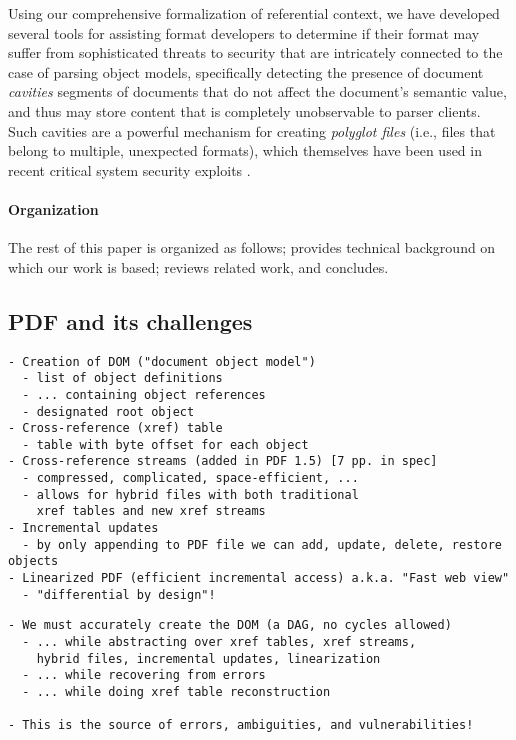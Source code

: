 Using our comprehensive formalization of referential context, we have
developed several tools for assisting format developers to determine
if their format may suffer from sophisticated threats to security that
are intricately connected to the case of parsing object models,
specifically detecting the presence of document \emph{cavities}
segments of documents that do not affect the document's semantic
value, and thus may store content that is completely unobservable to
parser clients.
%
Such cavities are a powerful mechanism for creating \emph{polyglot
  files} (i.e., files that belong to multiple, unexpected formats),
which themselves have been used in recent critical system security
exploits .

\paragraph*{Organization} The rest of this paper is organized as
follows;
%
 provides technical background on which our work
is based;
%
%
 reviews related work, and %
 concludes.

\subsection{PDF and its challenges}
\label{sec:pdf-challenges}

\begin{lstlisting}[style=meta]
- Creation of DOM ("document object model")
  - list of object definitions
  - ... containing object references
  - designated root object
- Cross-reference (xref) table
  - table with byte offset for each object
- Cross-reference streams (added in PDF 1.5) [7 pp. in spec]
  - compressed, complicated, space-efficient, ...
  - allows for hybrid files with both traditional
    xref tables and new xref streams
- Incremental updates
  - by only appending to PDF file we can add, update, delete, restore objects
- Linearized PDF (efficient incremental access) a.k.a. "Fast web view"
  - "differential by design"!
\end{lstlisting}

\begin{lstlisting}[style=meta]
- We must accurately create the DOM (a DAG, no cycles allowed)
  - ... while abstracting over xref tables, xref streams,
    hybrid files, incremental updates, linearization
  - ... while recovering from errors
  - ... while doing xref table reconstruction

- This is the source of errors, ambiguities, and vulnerabilities!
\end{lstlisting}


